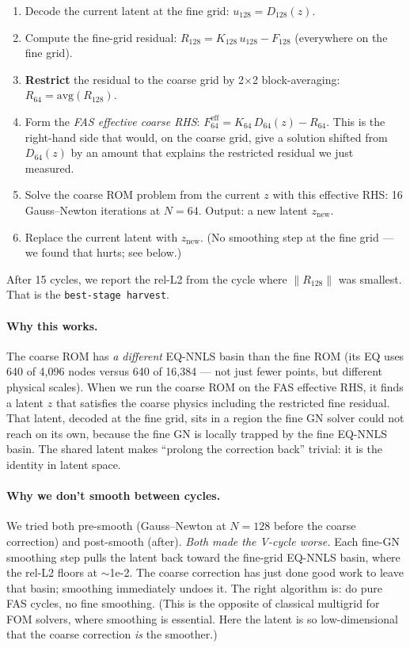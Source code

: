 \begin{enumerate}
  \item Decode the current latent at the fine grid: $u_{128} = D_{128}(z)$.
  \item Compute the fine-grid residual:
        $R_{128} = K_{128}\,u_{128} - F_{128}$ (everywhere on the fine grid).
  \item \textbf{Restrict} the residual to the coarse grid by 2$\times$2
        block-averaging: $R_{64} = \text{avg}(R_{128})$.
  \item Form the \emph{FAS effective coarse RHS}:
        $F_{64}^{\text{eff}} = K_{64}\,D_{64}(z) - R_{64}$.
        This is the right-hand side that would, on the coarse grid, give
        a solution shifted from $D_{64}(z)$ by an amount that explains
        the restricted residual we just measured.
  \item Solve the coarse ROM problem from the current $z$ with this
        effective RHS: 16 Gauss--Newton iterations at $N=64$. Output: a
        new latent $z_{\text{new}}$.
  \item Replace the current latent with $z_{\text{new}}$. (No smoothing
        step at the fine grid --- we found that hurts; see below.)
\end{enumerate}

After 15 cycles, we report the rel-L2 from the cycle where
$\|R_{128}\|$ was smallest. That is the \texttt{best-stage harvest}.

\paragraph{Why this works.}
The coarse ROM has \emph{a different} EQ-NNLS basin than the fine ROM
(its EQ uses 640 of 4{,}096 nodes versus 640 of 16{,}384 --- not just
fewer points, but different physical scales). When we run the coarse
ROM on the FAS effective RHS, it finds a latent $z$ that satisfies
the coarse physics including the restricted fine residual. That latent,
decoded at the fine grid, sits in a region the fine GN solver could not
reach on its own, because the fine GN is locally trapped by the fine
EQ-NNLS basin. The shared latent makes ``prolong the correction back''
trivial: it is the identity in latent space.

\paragraph{Why we don't smooth between cycles.}
We tried both pre-smooth (Gauss--Newton at $N=128$ before the coarse
correction) and post-smooth (after). \emph{Both made the V-cycle worse.}
Each fine-GN smoothing step pulls the latent back toward the
fine-grid EQ-NNLS basin, where the rel-L2 floors at $\sim$1e-2. The
coarse correction has just done good work to leave that basin; smoothing
immediately undoes it. The right algorithm is: do pure FAS cycles, no
fine smoothing. (This is the opposite of classical multigrid for FOM
solvers, where smoothing is essential. Here the latent is so
low-dimensional that the coarse correction \emph{is} the smoother.)

